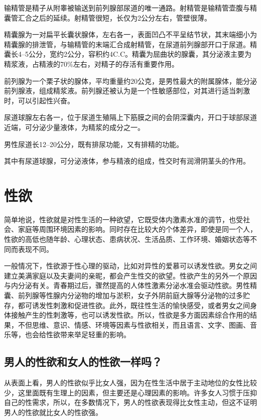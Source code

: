 \documentclass[12pt,UTF8]{ctexbook}
\begin{document}
输精管是精子从附睾被输送到前列腺部尿道的唯一通路。射精管是输精管壶腹与精囊管汇合之后的延续。射精管很短，长仅为2公分左右，管壁很薄。

精囊腺为一对扁平长囊状腺体，左右各一，表面凹凸不平呈结节状，其末端细小为精囊腺的排泄管，与输精管的末端汇合成射精管，在尿道前列腺部开口于尿道。精囊长4--5公分，宽约2公分，容积约4C.C。精囊为屈曲状的腺囊，其分泌液主要为精浆液，占精液的70\%左右，对精子的存活有重要作用。

前列腺为一个栗子状的腺体，平均重量约20公克，是男性最大的附属腺体，能分泌前列腺液，组成精浆液。前列腺还被认为是一个性敏感部位，对其进行适当刺激时，可以引起性兴奋。

尿道球腺左右各一，位于尿道生殖隔上下筋膜之间的会阴深囊内，开口于球部尿道近端，可分泌少量液体，为精浆的成分之一。

男性尿道长12--20公分，既有排尿功能，又有排精的功能。

其中有尿道球腺，可分泌液体，参与精液的组成，性交时有润滑阴茎头的作用。

\part{性欲}

简单地说，性欲就是对性生活的一种欲望，它既受体内激素水准的调节，也受社会、家庭等周围环境因素的影响。同时存在比较大的个体差异，即使是同一个人，性欲的高低也随年龄、心理状态、患病状况、生活品质、工作环境、婚姻状态等不同而表现不同。

一般情况下，性欲源于性心理的驱动，比如对异性的爱慕可以诱发性欲。男女之间建立美满家庭以及夫妻间的亲昵，都会产生性交的欲望。性欲产生的另外一个原因与内分泌有关。青春期过后，骤然提高的人体性激素分泌水准会驱动性欲。男性精囊、前列腺等性腺内分泌物的增加与淤积，女子外阴前庭大腺等分泌物的过多贮存，都可诱发性刺激和促进性欲。此外，既往性生活的愉快感受，或者男女之间身体接触产生的性刺激等，也可以诱发性欲。所以，性欲是多方面因素综合作用的结果，不但思维、意识、情感、环境等因素与性欲相关，而且语言、文字、图画、音乐等，也会给性欲带来举足轻重的影响。

\chapter{男人的性欲和女人的性欲一样吗？}

从表面上看，男人的性欲似乎比女人强，因为在性生活中居于主动地位的女性比较少，这里面既有生理上的因素，但主要还是心理因素的影响。许多女人习惯于压抑自己的性需求，所以，在多数情况下，男人的性欲表现得比女性主动，但这不证明男人的性欲就比女人的性欲强。
\end{document}
